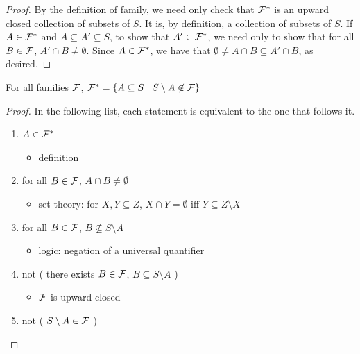\begin{proof}
    By the definition of family, we need only check that $\mathcal{F}^*$ is an upward closed collection of subsets of $S$.  It is, by definition, a collection of subsets of $S$.  If $A \in \mathcal{F}^*$ and $A \subseteq A' \subseteq S$, to show that $A' \in \mathcal{F}^*$, we need only to show that for all $B \in \mathcal{F}$, $A' \cap B \neq \emptyset$.  Since $A \in \mathcal{F}^*$, we have that $\emptyset \neq A \cap B \subseteq A' \cap B$, as desired.
\end{proof}

\begin{theorem}
    \label{thm_equiv_fam_dual_formulation}
    \leanok{}
    For all families $\mathcal{F}$, $\mathcal{F}^* = \{A \subseteq S \mid S \setminus A \not\in \mathcal{F}\}$
\end{theorem}

\begin{proof}
\leanok{}
In the following list, each statement is equivalent to the one that follows it.
    \begin{enumerate}
        \item $A \in \mathcal{F}^*$
        \begin{itemize}
            \item[--] definition
        \end{itemize}
        \item for all $B \in \mathcal{F}$, $A \cap B \neq \emptyset$
        \begin{itemize}
            \item[--] set theory: for $X, Y \subseteq Z$, $X \cap Y = \emptyset$ iff $Y \subseteq Z \setminus X$
        \end{itemize}
        \item for all $B \in \mathcal{F}$, $B \not\subseteq S \setminus A$
        \begin{itemize}
            \item[--] logic: negation of a universal quantifier
        \end{itemize}
        \item not ( there exists $B \in \mathcal{F}$, $B \subseteq S \setminus A$ )
        \begin{itemize}
            \item[--] $\mathcal{F}$ is upward closed
        \end{itemize}
        \item not ( $S \setminus A \in \mathcal{F}$ )
    \end{enumerate}
\end{proof}

